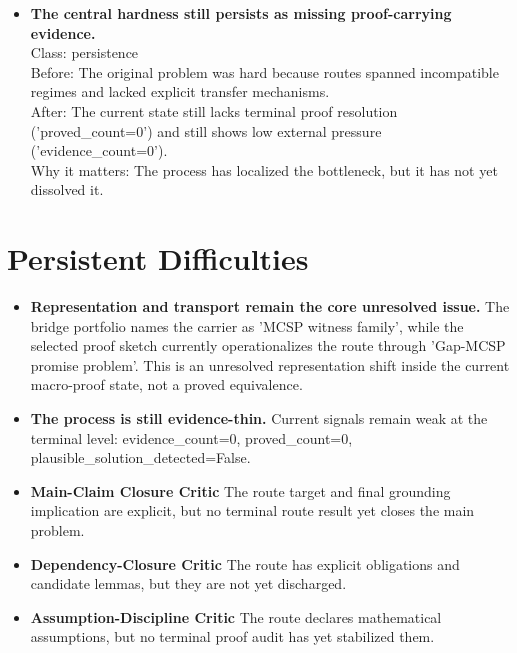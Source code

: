\documentclass[11pt]{article}
\begin{document}
\begin{itemize}[leftmargin=1.5em]
\\ After: The process now exposes a persistent queue with 56 pending theorem-shaped proof targets and explicit route lemmas.
\\ Why it matters: This changes the discovery process from free exploration into an auditable sequence of prove-or-disprove tasks.
\item \textbf{The central hardness still persists as missing proof-carrying evidence.}
\\ Class: persistence
\\ Before: The original problem was hard because routes spanned incompatible regimes and lacked explicit transfer mechanisms.
\\ After: The current state still lacks terminal proof resolution ('proved\_count=0') and still shows low external pressure ('evidence\_count=0').
\\ Why it matters: The process has localized the bottleneck, but it has not yet dissolved it.
\end{itemize}

\section{Persistent Difficulties}
\begin{itemize}[leftmargin=1.5em]
\item \textbf{Representation and transport remain the core unresolved issue.} The bridge portfolio names the carrier as 'MCSP witness family', while the selected proof sketch currently operationalizes the route through 'Gap-MCSP promise problem'. This is an unresolved representation shift inside the current macro-proof state, not a proved equivalence.
\item \textbf{The process is still evidence-thin.} Current signals remain weak at the terminal level: evidence\_count=0, proved\_count=0, plausible\_solution\_detected=False.
\item \textbf{Main-Claim Closure Critic} The route target and final grounding implication are explicit, but no terminal route result yet closes the main problem.
\item \textbf{Dependency-Closure Critic} The route has explicit obligations and candidate lemmas, but they are not yet discharged.
\item \textbf{Assumption-Discipline Critic} The route declares mathematical assumptions, but no terminal proof audit has yet stabilized them.
\end{itemize}
\end{document}
